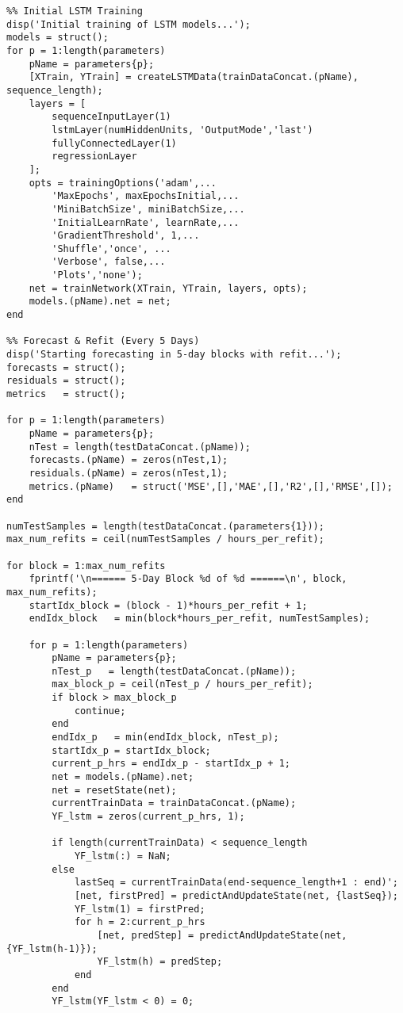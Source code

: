 \begin{verbatim}
%% Initial LSTM Training
disp('Initial training of LSTM models...');
models = struct();
for p = 1:length(parameters)
    pName = parameters{p};
    [XTrain, YTrain] = createLSTMData(trainDataConcat.(pName), sequence_length);
    layers = [
        sequenceInputLayer(1)
        lstmLayer(numHiddenUnits, 'OutputMode','last')
        fullyConnectedLayer(1)
        regressionLayer
    ];
    opts = trainingOptions('adam',...
        'MaxEpochs', maxEpochsInitial,...
        'MiniBatchSize', miniBatchSize,...
        'InitialLearnRate', learnRate,...
        'GradientThreshold', 1,...
        'Shuffle','once', ...
        'Verbose', false,...
        'Plots','none');
    net = trainNetwork(XTrain, YTrain, layers, opts);
    models.(pName).net = net;
end

%% Forecast & Refit (Every 5 Days)
disp('Starting forecasting in 5-day blocks with refit...');
forecasts = struct();
residuals = struct();
metrics   = struct();

for p = 1:length(parameters)
    pName = parameters{p};
    nTest = length(testDataConcat.(pName));
    forecasts.(pName) = zeros(nTest,1);
    residuals.(pName) = zeros(nTest,1);
    metrics.(pName)   = struct('MSE',[],'MAE',[],'R2',[],'RMSE',[]);
end

numTestSamples = length(testDataConcat.(parameters{1}));
max_num_refits = ceil(numTestSamples / hours_per_refit);

for block = 1:max_num_refits
    fprintf('\n====== 5-Day Block %d of %d ======\n', block, max_num_refits);
    startIdx_block = (block - 1)*hours_per_refit + 1;
    endIdx_block   = min(block*hours_per_refit, numTestSamples);
    
    for p = 1:length(parameters)
        pName = parameters{p};
        nTest_p   = length(testDataConcat.(pName));
        max_block_p = ceil(nTest_p / hours_per_refit);
        if block > max_block_p
            continue;
        end
        endIdx_p   = min(endIdx_block, nTest_p);
        startIdx_p = startIdx_block;
        current_p_hrs = endIdx_p - startIdx_p + 1;
        net = models.(pName).net;
        net = resetState(net);
        currentTrainData = trainDataConcat.(pName);
        YF_lstm = zeros(current_p_hrs, 1);
        
        if length(currentTrainData) < sequence_length
            YF_lstm(:) = NaN;
        else
            lastSeq = currentTrainData(end-sequence_length+1 : end)';
            [net, firstPred] = predictAndUpdateState(net, {lastSeq});
            YF_lstm(1) = firstPred;
            for h = 2:current_p_hrs
                [net, predStep] = predictAndUpdateState(net, {YF_lstm(h-1)});
                YF_lstm(h) = predStep;
            end
        end
        YF_lstm(YF_lstm < 0) = 0;
        

\end{verbatim}
